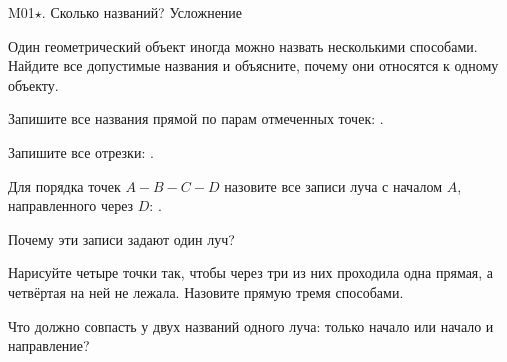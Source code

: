 \worksheettitle
  {M01\(\star\). Сколько названий?}
  { Усложнение}

\studentnameblock

\begin{notebox}
  Один геометрический объект иногда можно назвать несколькими способами.
  Найдите все допустимые названия и объясните, почему они относятся к одному
  объекту.
\end{notebox}

\threelinepointsfigure

\begin{practicebox}
  Запишите все названия прямой по парам отмеченных точек:
  \answerblank[105mm].

  Запишите все отрезки: \answerblank[90mm].
\end{practicebox}

\begin{practicebox}
  Для порядка точек $A-B-C-D$ назовите все записи луча с началом $A$,
  направленного через $D$: \answerblank[90mm].

  Почему эти записи задают один луч? 
\end{practicebox}

\begin{practicebox}
  Нарисуйте четыре точки так, чтобы через три из них проходила одна прямая,
  а четвёртая на ней не лежала. Назовите прямую тремя способами.
  \workarea{38mm}
\end{practicebox}

\begin{checkpointbox}[Вывод]
  Что должно совпасть у двух названий одного луча: только начало или начало и
  направление? 
\end{checkpointbox}
